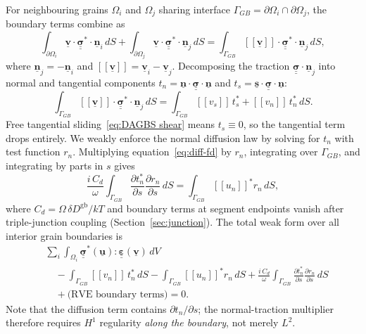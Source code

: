 \documentclass[12pt]{article}
\newcommand{\pd}[2]{\frac{\partial{#1}}{\partial{#2}}}
\newcommand{\tensor}[1]{\underline{\underline{\boldsymbol{#1}}}}
\newcommand{\vect}[1]{\underline{\boldsymbol{#1}}}
\newcommand{\jump}[1]{[\![#1]\!]}
\begin{document}
For neighbouring grains $\Omega_i$ and $\Omega_j$ sharing interface $\Gamma_{GB} = \partial\Omega_i \cap \partial\Omega_j$, the boundary terms combine as
\begin{equation}
    \int_{\partial\Omega_i} \vect{v}\cdot\tensor{\sigma}^*\cdot\vect{n}_i\, dS
    + \int_{\partial\Omega_j} \vect{v}\cdot\tensor{\sigma}^*\cdot\vect{n}_j\, dS
    = \int_{\Gamma_{GB}} \jump{\vect{v}}\cdot\tensor{\sigma}^*\cdot\vect{n}_j\, dS,
\end{equation}
where $\vect{n}_j = -\vect{n}_i$ and $\jump{\vect{v}} = \vect{v}_i - \vect{v}_j$. Decomposing the traction $\tensor{\sigma}\cdot\vect{n}_j$ into normal and tangential components $t_n = \vect{n}\cdot\tensor{\sigma}\cdot\vect{n}$ and $t_s = \vect{s}\cdot\tensor{\sigma}\cdot\vect{n}$:
\begin{equation}
    \int_{\Gamma_{GB}} \jump{\vect{v}}\cdot\tensor{\sigma}^*\cdot\vect{n}_j\, dS
    = \int_{\Gamma_{GB}} \jump{v_s}\,t_s^* + \jump{v_n}\,t_n^*\, dS.
\end{equation}
Free tangential sliding~\eqref{eq:DAGBS shear} means $t_s \equiv 0$, so the tangential term drops entirely. We weakly enforce the normal diffusion law by solving for $t_n$ with test function $r_n$. Multiplying equation~\eqref{eq:diff-fd} by $r_n$, integrating over $\Gamma_{GB}$, and integrating by parts in $s$ gives
\begin{equation}
    \frac{i\,C_d}{\omega}\int_{\Gamma_{GB}}\pd{t_n^*}{s}\pd{r_n}{s}\, dS = \int_{\Gamma_{GB}} \jump{u_n}^* r_n\, dS,
    \label{eq:diff-weak}
\end{equation}
where $C_d = \Omega\,\delta D^{\mathrm{gb}}/kT$ and boundary terms at segment endpoints vanish after triple-junction coupling (Section~\ref{sec:junction}). The total weak form over all interior grain boundaries is
\begin{equation}
\begin{aligned}
&\sum_i \int_{\Omega_i} \tensor{\sigma}^*(\vect{u}) : \tensor{\varepsilon}(\vect{v})\, dV \\
&\quad - \int_{\Gamma_{GB}} \jump{v_n}\, t_n^*\, dS
  - \int_{\Gamma_{GB}} \jump{u_n}^* r_n\, dS
  + \frac{i\,C_d}{\omega}\int_{\Gamma_{GB}}\pd{t_n^*}{s}\pd{r_n}{s}\, dS \\
&\quad + \text{(RVE boundary terms)} = 0. \label{eq:weak-full}
\end{aligned}
\end{equation}
Note that the diffusion term contains $\partial t_n / \partial s$; the normal-traction multiplier therefore requires $H^1$ regularity \emph{along the boundary}, not merely $L^2$.
\end{document}
